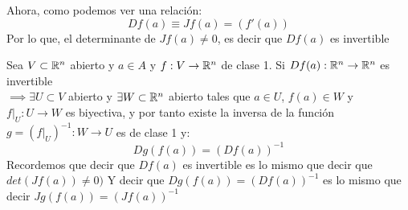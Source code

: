 Ahora, como podemos ver una relación:
\[
Df(a) \equiv Jf(a) = ( f'(a))
\]
Por lo que, el determinante de $Jf(a) \ne 0$, es decir que $Df(a)$ es invertible
\begin{nth}
	Sea $V \subset \mathbb{R}^n$ abierto y $a\in A$ y $f:V \to \mathbb{R}^n$ de clase 1. Si
$Df(a): \mathbb{R}^n \to \mathbb{R}^n$ es invertible \\
$\implies \exists U\subset V$ abierto y $\exists W\subset\mathbb{R}^n$ abierto tales que $a\in U $, $f(a) \in W$ y $f|_U : U \to W$ es biyectiva, y por tanto existe la inversa de la función $g = (f|_U)^{-1}: W \to U$ es de clase 1 y:
	\[
	Dg(f(a)) = (Df(a))^{-1}
	\]
Recordemos que decir que $Df(a)$ es invertible es lo mismo que decir que $det(Jf(a)) \ne 0)$
Y decir que $Dg(f(a)) = (Df(a))^{-1}$ es lo mismo que decir $Jg(f(a)) = (Jf(a))^{-1}$
\end{nth}
